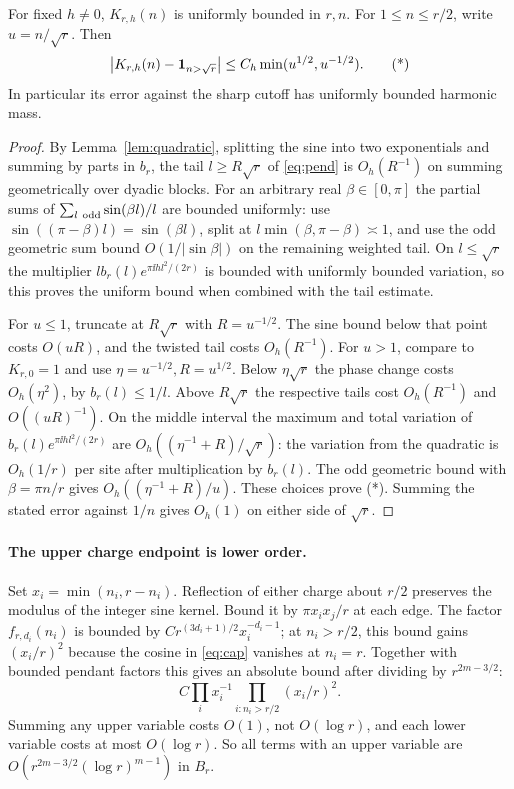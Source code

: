 \begin{lemma}\label{lem:pendant}
For fixed \(h\ne0\), \(K_{r,h}(n)\) is uniformly bounded in \(r,n\). For \(1\le n\le r/2\), write \(u=n/\sqrt r\). Then
\[
 \left|K_{r,h}(n)-\mathbf 1_{n>\sqrt r}\right|
 \le C_h\min(u^{1/2},u^{-1/2}).
 \tag{*}
\]
In particular its error against the sharp cutoff has uniformly bounded harmonic mass.
\end{lemma}
\begin{proof}
By Lemma~\ref{lem:quadratic}, splitting the sine into two exponentials and summing by parts in \(b_r\), the tail \(l\ge R\sqrt r\) of \eqref{eq:pend} is \(O_h(R^{-1})\) on summing geometrically over dyadic blocks. For an arbitrary real \(\beta\in[0,\pi]\) the partial sums of \(\sum_{l\ {\rm odd}}\sin(\beta l)/l\) are bounded uniformly: use \(\sin((\pi-\beta)l)=\sin(\beta l)\), split at \(l\min(\beta,\pi-\beta)\asymp1\), and use the odd geometric sum bound \(O(1/|\sin\beta|)\) on the remaining weighted tail. On \(l\le\sqrt r\) the multiplier \(l b_r(l)e^{\pi\ii h l^2/(2r)}\) is bounded with uniformly bounded variation, so this proves the uniform bound when combined with the tail estimate.

For \(u\le1\), truncate at \(R\sqrt r\) with \(R=u^{-1/2}\). The sine bound below that point costs \(O(uR)\), and the twisted tail costs \(O_h(R^{-1})\). For \(u>1\), compare to \(K_{r,0}=1\) and use \(\eta=u^{-1/2}, R=u^{1/2}\). Below \(\eta\sqrt r\) the phase change costs \(O_h(\eta^2)\), by \(b_r(l)\le1/l\). Above \(R\sqrt r\) the respective tails cost \(O_h(R^{-1})\) and \(O((uR)^{-1})\). On the middle interval the maximum and total variation of \(b_r(l)e^{\pi\ii h l^2/(2r)}\) are \(O_h((\eta^{-1}+R)/\sqrt r)\): the variation from the quadratic is \(O_h(1/r)\) per site after multiplication by \(b_r(l)\). The odd geometric bound with \(\beta=\pi n/r\) gives \(O_h((\eta^{-1}+R)/u)\). These choices prove (*). Summing the stated error against \(1/n\) gives \(O_h(1)\) on either side of \(\sqrt r\).
\end{proof}

\paragraph{The upper charge endpoint is lower order.}
Set \(x_i=\min(n_i,r-n_i)\). Reflection of either charge about \(r/2\) preserves the modulus of the integer sine kernel. Bound it by \(\pi x_i x_j/r\) at each edge. The factor \(f_{r,d_i}(n_i)\) is bounded by \(C r^{(3d_i+1)/2}x_i^{-d_i-1}\); at \(n_i>r/2\), this bound gains \((x_i/r)^2\) because the cosine in \eqref{eq:cap} vanishes at \(n_i=r\). Together with bounded pendant factors this gives an absolute bound after dividing by \(r^{2m-3/2}\):
\[
 C\prod_i x_i^{-1}\prod_{i:n_i>r/2}(x_i/r)^2.
\]
Summing any upper variable costs \(O(1)\), not \(O(\log r)\), and each lower variable costs at most \(O(\log r)\). So all terms with an upper variable are \(O(r^{2m-3/2}(\log r)^{m-1})\) in \(B_r\).

